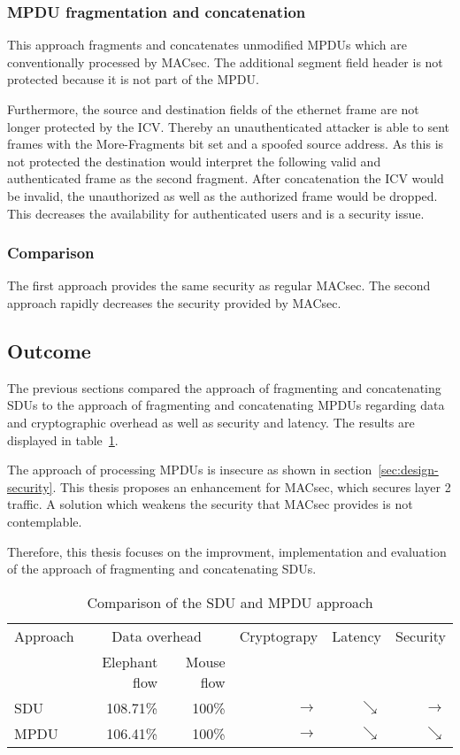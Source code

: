 \subsubsection{MPDU fragmentation and concatenation}
This approach fragments and concatenates unmodified \glspl{MPDU} which are conventionally processed by \gls{MACsec}.
The additional segment field header is not protected because it is not part of the \gls{MPDU}.

Furthermore, the source and destination fields of the ethernet frame are not longer protected by the \gls{ICV}.
Thereby an unauthenticated attacker is able to sent frames with the More-Fragments bit set and a spoofed source address.
As this is not protected the destination would interpret the following valid and authenticated frame as the second fragment.
After concatenation the ICV would be invalid, the unauthorized as well as the authorized frame would be dropped.
This decreases the availability for authenticated users and is a security issue.

\subsubsection{Comparison}
The first approach provides the same security as regular \gls{MACsec}.
The second approach rapidly decreases the security provided by \gls{MACsec}.

\subsection{Outcome}
The previous sections compared the approach of fragmenting and concatenating \glspl{SDU} to the approach of fragmenting and concatenating \glspl{MPDU} regarding data and cryptographic overhead as well as security and latency.
The results are displayed in table~\ref{tab:draft-approach-comparison}.

The approach of processing \glspl{MPDU} is insecure as shown in section~\ref{sec:design-security}.
This thesis proposes an enhancement for \gls{MACsec}, which secures layer 2 traffic.
A solution which weakens the security that \gls{MACsec} provides is not contemplable.

Therefore, this thesis focuses on the improvment, implementation and evaluation of the approach of fragmenting and concatenating \glspl{SDU}.

\begin{table}
  \centering
  \begin{tabular}{lrrrrr}
    \toprule
    Approach & \multicolumn{2}{c}{Data overhead} & Cryptograpy & Latency & Security\\
    & Elephant flow & Mouse flow & & & \\
    \midrule
    SDU & 108.71\% & 100\% & $\rightarrow$ & $\searrow$ & $\rightarrow$\\
    MPDU & 106.41\% & 100\% & $\rightarrow$ &  $\searrow$ & $\searrow$\\
    \bottomrule
  \end{tabular}
  \caption[Comparison of fragmentation design approaches]{Comparison of the \gls{SDU} and \gls{MPDU} approach}
  \label{tab:draft-approach-comparison}
\end{table}
